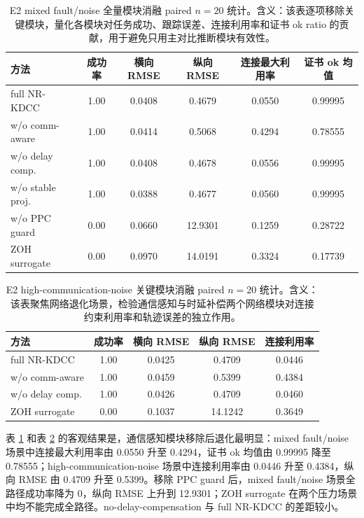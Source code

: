 \documentclass[twocolumn,3p,times,procedia]{elsarticle}
\newcommand{\Method}{NR-KDCC}
\begin{document}
\begin{table}[!t]
\centering
\caption{E2 mixed fault/noise 全量模块消融 paired $n=20$ 统计。含义：该表逐项移除关键模块，量化各模块对任务成功、跟踪误差、连接利用率和证书 ok ratio 的贡献，用于避免只用主对比推断模块有效性。}
\label{tab:e2_mixed}
\footnotesize
\begin{tabular}{lccccc}
\toprule
方法 & 成功率 & 横向 RMSE & 纵向 RMSE & 连接最大利用率 & 证书 ok 均值 \\
\midrule
full \Method{} & 1.00 & 0.0408 & 0.4679 & 0.0550 & 0.99995\\
w/o comm-aware & 1.00 & 0.0414 & 0.5068 & 0.4294 & 0.78555\\
w/o delay comp. & 1.00 & 0.0408 & 0.4678 & 0.0556 & 0.99995\\
w/o stable proj. & 1.00 & 0.0388 & 0.4677 & 0.0560 & 0.99995\\
w/o PPC guard & 0.00 & 0.0660 & 12.9301 & 0.1259 & 0.28722\\
ZOH surrogate & 0.00 & 0.0970 & 14.0191 & 0.3324 & 0.17739\\
\bottomrule
\end{tabular}
\end{table}

\begin{table}[!t]
\centering
\caption{E2 high-communication-noise 关键模块消融 paired $n=20$ 统计。含义：该表聚焦网络退化场景，检验通信感知与时延补偿两个网络模块对连接约束利用率和轨迹误差的独立作用。}
\label{tab:e2_comm}
\footnotesize
\begin{tabular}{lcccc}
\toprule
方法 & 成功率 & 横向 RMSE & 纵向 RMSE & 连接利用率\\
\midrule
full \Method{} & 1.00 & 0.0425 & 0.4709 & 0.0446\\
w/o comm-aware & 1.00 & 0.0459 & 0.5399 & 0.4384\\
w/o delay comp. & 1.00 & 0.0426 & 0.4709 & 0.0460\\
ZOH surrogate & 0.00 & 0.1037 & 14.1242 & 0.3649\\
\bottomrule
\end{tabular}
\end{table}

表 \ref{tab:e2_mixed} 和表 \ref{tab:e2_comm} 的客观结果是，通信感知模块移除后退化最明显：mixed fault/noise 场景中连接最大利用率由 0.0550 升至 0.4294，证书 ok 均值由 0.99995 降至 0.78555；high-communication-noise 场景中连接利用率由 0.0446 升至 0.4384，纵向 RMSE 由 0.4709 升至 0.5399。移除 PPC guard 后，mixed fault/noise 场景全路径成功率降为 0，纵向 RMSE 上升到 12.9301；ZOH surrogate 在两个压力场景中均不能完成全路径。no-delay-compensation 与 full \Method{} 的差距较小。
\end{document}
